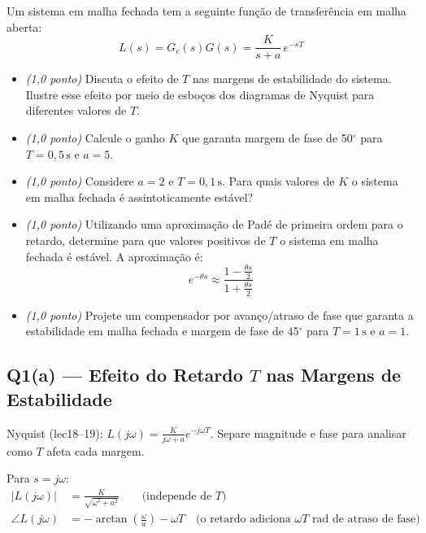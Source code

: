 \documentclass[12pt,a4paper]{article}
\newcommand{\degrees}{\ensuremath{^{\circ}}}
\begin{document}
\begin{enunciado}
Um sistema em malha fechada tem a seguinte função de transferência em malha
aberta:
\[
  L(s) = G_c(s)G(s) = \frac{K}{s + a}\,e^{-sT}
\]
\begin{itemize}
  \item[(a)] \textit{(1{,}0 ponto)} Discuta o efeito de $T$ nas margens de
  estabilidade do sistema. Ilustre esse efeito por meio de esboços dos diagramas
  de Nyquist para diferentes valores de $T$.
  \item[(b)] \textit{(1{,}0 ponto)} Calcule o ganho $K$ que garanta margem de
  fase de 50\degrees{} para $T = 0{,}5\,\mathrm{s}$ e $a = 5$.
  \item[(c)] \textit{(1{,}0 ponto)} Considere $a = 2$ e $T = 0{,}1\,\mathrm{s}$.
  Para quais valores de $K$ o sistema em malha fechada é assintoticamente estável?
  \item[(d)] \textit{(1{,}0 ponto)} Utilizando uma aproximação de Padé de
  primeira ordem para o retardo, determine para que valores positivos de $T$ o
  sistema em malha fechada é estável. A aproximação é:
  \[
    e^{-\theta s} \approx \frac{1 - \tfrac{\theta s}{2}}{1 + \tfrac{\theta s}{2}}
  \]
  \item[(e)] \textit{(1{,}0 ponto)} Projete um compensador por avanço/atraso de
  fase que garanta a estabilidade em malha fechada e margem de fase de 45\degrees{}
  para $T = 1\,\mathrm{s}$ e $a = 1$.
\end{itemize}
\end{enunciado}

\subsection*{Q1(a) — Efeito do Retardo $T$ nas Margens de Estabilidade}

\begin{metodo}
  Nyquist (lec18--19): $L(j\omega) = \frac{K}{j\omega + a}e^{-j\omega T}$.
  Separe magnitude e fase para analisar como $T$ afeta cada margem.
\end{metodo}

Para $s = j\omega$:
\begin{align}
  |L(j\omega)| &= \frac{K}{\sqrt{\omega^2 + a^2}} \qquad \text{(independe de }T\text{)} \\
  \angle L(j\omega) &= -\arctan\!\!\left(\frac{\omega}{a}\right) - \omega T
  \quad\text{(o retardo adiciona }{\omega T}\text{ rad de atraso de fase)}
\end{align}
\end{document}
